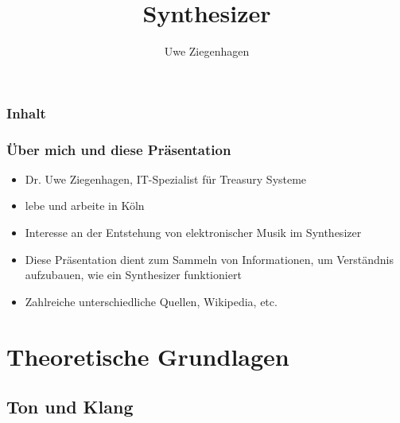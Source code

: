 \documentclass[11pt,ngerman]{beamer}
\author{Uwe Ziegenhagen}
\title{Synthesizer}
\begin{document}
 
 \begin{frame}

\maketitle
 
 \end{frame}
 
 
\begin{frame}
\frametitle{Inhalt}

\tableofcontents

\end{frame}
 
 \begin{frame}
 \frametitle{Über mich und diese Präsentation}
 
\begin{itemize}
 \item Dr. Uwe Ziegenhagen, IT-Spezialist für Treasury Systeme \item lebe und arbeite in Köln
 \item Interesse an der Entstehung von elektronischer Musik im Synthesizer
 \item Diese Präsentation dient zum Sammeln von Informationen, um Verständnis aufzubauen, wie ein Synthesizer funktioniert
 \item Zahlreiche unterschiedliche Quellen, Wikipedia, etc.
\end{itemize}
 \end{frame}
 
\section{Theoretische Grundlagen}

\subsection{Ton und Klang}
\end{document}

